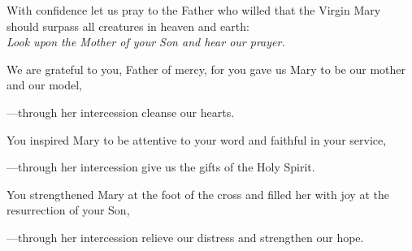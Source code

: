 \intercessions\indent

\begin{hangpar}

With confidence let us pray to the Father who willed that the Virgin Mary should surpass all creatures in heaven and earth:\\
\emph{Look upon the Mother of your Son and hear our prayer.}

\medskip We are grateful to you, Father of mercy, for you gave us Mary to be our mother and our model,

{\color{red}---\thinspace}through her intercession cleanse our hearts.

\medskip You inspired Mary to be attentive to your word and faithful in your service,

{\color{red}---\thinspace}through her intercession give us the gifts of the Holy Spirit.

\medskip You strengthened Mary at the foot of the cross and filled her with joy at the resurrection of your Son,

{\color{red}---\thinspace}through her intercession relieve our distress and strengthen our hope.

\end{hangpar}

